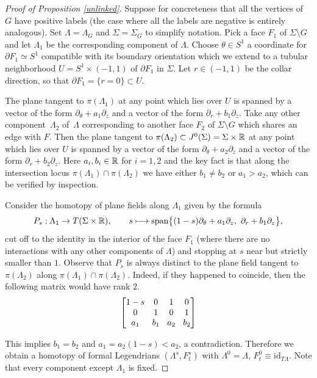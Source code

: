 \documentclass[11pt]{article}
\numberwithin{equation}{section}\providecommand{\dpl}{\displaystyle}
\newcommand\mto{\mathchoice{\longmapsto}{\mapsto}{\mapsto}{\mapsto}}
\newcommand{\id}{\mathrm{id}}
\theoremstyle{plain}
\theoremstyle{definition}
\newcommand{\mat}[1]{\ensuremath{
\left[\begin{matrix}#1
\end{matrix}\right]
}}
\begin{document}
\begin{proof}[Proof of Proposition \ref{unlinked}]
Suppose for concreteness that all the vertices of $G$ have positive labels (the case where all the labels are negative is entirely analogous). Set $\Lambda=\Lambda_G$ and $\Sigma=\Sigma_G$ to simplify notation. Pick a face $F_1$ of $\Sigma \setminus G$ and let $\Lambda_1$ be the corresponding component of $\Lambda$. Choose $\theta \in S^1$ a coordinate for $\partial F_1 \simeq S^1$ compatible with its boundary orientation which we extend to a tubular neighborhood $U=S^1 \times (-1,1)$ of $\partial F_1$ in $\Sigma$. Let $r \in (-1,1)$ be the collar direction, so that $\partial F_1 = \{ r=0\} \subset U$.

The plane tangent to $\pi(\Lambda_1)$ at any point which lies over $U$ is spanned by a vector of the form $ \partial_\theta + a_1 \partial_z$ and a vector of the form $ \partial_r + b_1 \partial_z$. Take any other component~$\Lambda_2$ of~$\Lambda$ corresponding to another face $F_2$ of $\Sigma \setminus G$ which shares an edge with $F$. Then the plane tangent to $\pi(\Lambda_2) \subset J^0(\Sigma)=\Sigma \times \mathbb{R}$ at any point which lies over $U$ is spanned by a vector of the form $ \partial_\theta + a_2 \partial_z$ and a vector of the form $ \partial_r + b_2 \partial_z$. Here $a_i,b_i \in \mathbb{R}$ for $i=1,2$ and the key fact is that along the intersection locus $\pi(\Lambda_1) \cap \pi(\Lambda_2)$ we have either $b_1 \neq b_2$ or $a_1>a_2$, which can be verified by inspection.

Consider the homotopy of plane fields along $\Lambda_1$ given by the formula
\[
P_s : \Lambda_1 \to T(\Sigma \times \bR), \qquad s \mto \text{span} \big\{ (1-s)\partial_\theta + a_1\partial_z, \, \, \partial_r + b_1 \partial_z \big\},
\]
cut off to the identity in the interior of the face $F_1$ (where there are no interactions with any other components of $\Lambda$) and stopping at $s$ near but strictly smaller than $1$. Observe that $P_s$ is always distinct to the plane field tangent to $\pi(\Lambda_2)$ along $\pi(\Lambda_1) \cap \pi(\Lambda_2)$. Indeed, if they happened to coincide, then the following matrix would have rank $2$.
\[\arraycolsep4.5pt \mat{1-s & 0 & 1 & 0 \\
0 & 1 & 0 & 1 \\
a_1& b_1 &a_2 &b_2 } \]

This implies $b_1=b_2$ and $a_1=a_2(1-s)<a_2$, a contradiction. Therefore we obtain a homotopy of formal Legendrians $(\Lambda^s,F^s_t)$ with $\Lambda^0=\Lambda$, $F^0_t \equiv \id_{T \Lambda}$. Note that every component except $\Lambda_1$ is fixed.


\end{proof}
\end{document}
